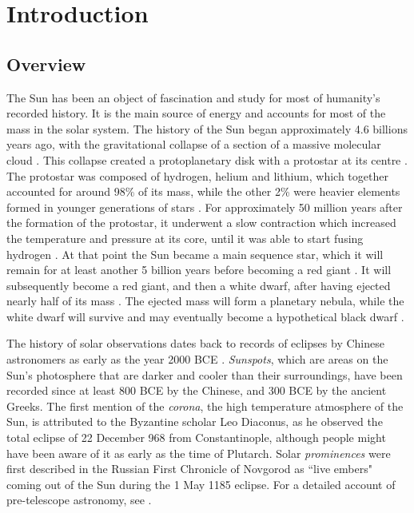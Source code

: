 
\chapter{Introduction}
\label{chap:intro}

\section{Overview}
\label{sec:overview}

The Sun has been an object of fascination and study for most of humanity's recorded history.
It is the main source of energy and accounts for most of the mass in the solar system.
The history of the Sun began approximately 4.6 billions years ago, with the gravitational collapse of a section of a massive molecular cloud \citep{Bouvier2010}.
This collapse created a protoplanetary disk with a protostar at its centre \citep{Montmerle2006}.
The protostar was composed of hydrogen, helium and lithium, which together accounted for around 98\% of its mass, while the other 2\% were heavier elements formed in younger generations of stars \citep{Zeilik1998}.
For approximately 50 million years after the formation of the protostar, it underwent a slow contraction which increased the temperature and pressure at its core, until it was able to start fusing hydrogen \citep{Yi2001}.
At that point the Sun became a main sequence star, which it will remain for at least another 5 billion years before becoming a red giant \citep{Schroder2008}.
It will subsequently become a red giant, and then a white dwarf, after having ejected nearly half of its mass \citep{Schroder2008}.
The ejected mass will form a planetary nebula, while the white dwarf will survive and may eventually become a hypothetical black dwarf \citep{Bloecker1995}.

The history of solar observations dates back to records of eclipses by Chinese astronomers as early as the year 2000 BCE \citep{Priest2014}.
\emph{Sunspots}, which are areas on the Sun's photosphere that are darker and cooler than their surroundings, have been recorded since at least 800 BCE by the Chinese, and 300 BCE by the ancient Greeks.
The first mention of the \emph{corona}, the high temperature atmosphere of the Sun, is attributed to the Byzantine scholar Leo Diaconus, as he observed the total eclipse of 22 December 968 from Constantinople, although people might have been aware of it as early as the time of Plutarch.
Solar \emph{prominences} were first described in the Russian First Chronicle of Novgorod as ``live embers" coming out of the Sun during the 1 May 1185 eclipse.
For a detailed account of pre-telescope astronomy, see \cite{Hetherington1996}.

